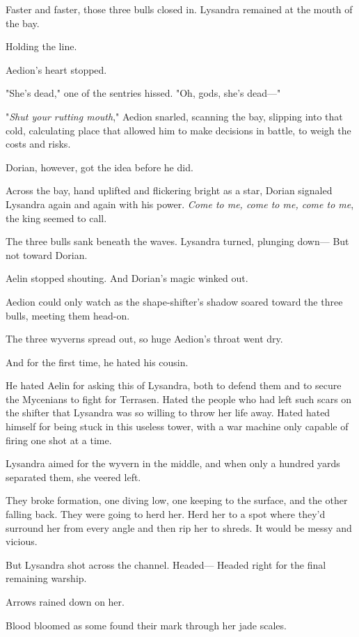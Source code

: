 Faster and faster, those three bulls closed in. Lysandra remained at the mouth of the bay.

Holding the line.

Aedion's heart stopped.

"She's dead," one of the sentries hissed. "Oh, gods, she's dead---"

"\emph{Shut your rutting mouth}," Aedion snarled, scanning the bay, slipping into that cold, calculating place that allowed him to make decisions in battle, to weigh the costs and risks.

Dorian, however, got the idea before he did.

Across the bay, hand uplifted and flickering bright as a star, Dorian signaled Lysandra again and again with his power. \emph{Come to me, come to me, come to me}, the king seemed to call.

The three bulls sank beneath the waves. Lysandra turned, plunging down--- But not toward Dorian.

Aelin stopped shouting. And Dorian's magic winked out.

Aedion could only watch as the shape-shifter's shadow soared toward the three bulls, meeting them head-on.

The three wyverns spread out, so huge Aedion's throat went dry.

And for the first time, he hated his cousin.

He hated Aelin for asking this of Lysandra, both to defend them and to secure the Mycenians to fight for Terrasen. Hated the people who had left such scars on the shifter that Lysandra was so willing to throw her life away. Hated  hated himself for being stuck in this useless tower, with a war machine only capable of firing one shot at a time.

Lysandra aimed for the wyvern in the middle, and when only a hundred yards separated them, she veered left.

They broke formation, one diving low, one keeping to the surface, and the other falling back. They were going to herd her. Herd her to a spot where they'd surround her from every angle and then rip her to shreds. It would be messy and vicious.

But Lysandra shot across the channel. Headed--- Headed right for the final remaining warship.

Arrows rained down on her.

Blood bloomed as some found their mark through her jade scales.

